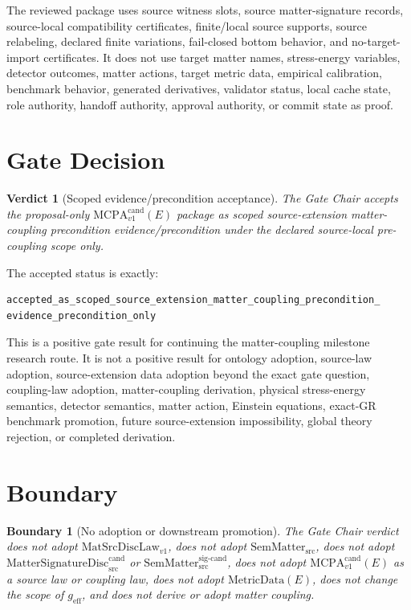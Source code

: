 \documentclass[11pt]{article}
\newcommand{\MetricData}{\mathrm{MetricData}}
\newcommand{\geff}{g_{\mathrm{eff}}}
\newcommand{\MatSrcDiscLaw}{\mathrm{MatSrcDiscLaw}_{v1}}
\newcommand{\SemMatterSrc}{\mathrm{SemMatter}_{\mathrm{src}}}
\newcommand{\SemMatterSig}{\mathrm{SemMatter}_{\mathrm{src}}^{\mathrm{sig\text{-}cand}}}
\newcommand{\MatSigDisc}{\mathrm{MatterSignatureDisc}_{\mathrm{src}}^{\mathrm{cand}}}
\newcommand{\MCPACand}{\mathrm{MCPA}^{\mathrm{cand}}_{v1}}
\newtheorem{verdict}{Verdict}
\newtheorem{boundary}{Boundary}
\begin{document}
The reviewed package uses source witness slots, source matter-signature
records, source-local compatibility certificates, finite/local source
supports, source relabeling, declared finite variations, fail-closed bottom
behavior, and no-target-import certificates. It does not use target matter
names, stress-energy variables, detector outcomes, matter actions, target
metric data, empirical calibration, benchmark behavior, generated derivatives,
validator status, local cache state, role authority, handoff authority,
approval authority, or commit state as proof.

\section{Gate Decision}

\begin{verdict}[Scoped evidence/precondition acceptance]
The Gate Chair accepts the proposal-only \(\MCPACand(E)\) package as scoped
source-extension matter-coupling precondition evidence/precondition under the
declared source-local pre-coupling scope only.
\end{verdict}

\noindent The accepted status is exactly:

\begin{verbatim}
accepted_as_scoped_source_extension_matter_coupling_precondition_
evidence_precondition_only
\end{verbatim}

This is a positive gate result for continuing the matter-coupling milestone
research route. It is not a positive result for ontology adoption, source-law
adoption, source-extension data adoption beyond the exact gate question,
coupling-law adoption, matter-coupling derivation, physical stress-energy
semantics, detector semantics, matter action, Einstein equations, exact-GR
benchmark promotion, future source-extension impossibility, global theory
rejection, or completed derivation.

\section{Boundary}

\begin{boundary}[No adoption or downstream promotion]
The Gate Chair verdict does not adopt \(\MatSrcDiscLaw\), does not adopt
\(\SemMatterSrc\), does not adopt \(\MatSigDisc\) or \(\SemMatterSig\), does
not adopt \(\MCPACand(E)\) as a source law or coupling law, does not adopt
\(\MetricData(E)\), does not change the scope of \(\geff\), and does not
derive or adopt matter coupling.
\end{boundary}
\end{document}
